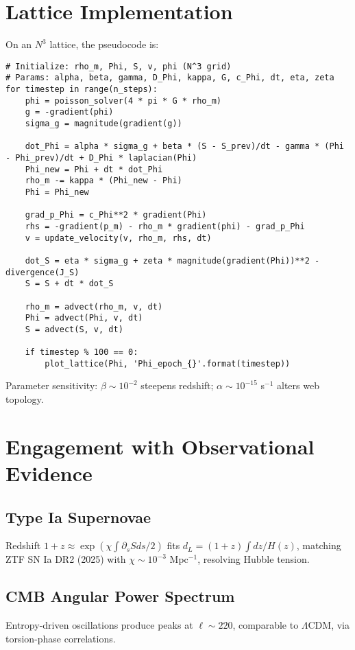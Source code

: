 \documentclass[11pt]{article}
\theoremstyle{plain}
\theoremstyle{definition}
\begin{document}
\section{Lattice Implementation}
\label{sec:simulation_results}
On an $N^3$ lattice, the pseudocode is:
\begin{small}
\begin{verbatim}
# Initialize: rho_m, Phi, S, v, phi (N^3 grid)
# Params: alpha, beta, gamma, D_Phi, kappa, G, c_Phi, dt, eta, zeta
for timestep in range(n_steps):
    phi = poisson_solver(4 * pi * G * rho_m)
    g = -gradient(phi)
    sigma_g = magnitude(gradient(g))
    
    dot_Phi = alpha * sigma_g + beta * (S - S_prev)/dt - gamma * (Phi - Phi_prev)/dt + D_Phi * laplacian(Phi)
    Phi_new = Phi + dt * dot_Phi
    rho_m -= kappa * (Phi_new - Phi)
    Phi = Phi_new
    
    grad_p_Phi = c_Phi**2 * gradient(Phi)
    rhs = -gradient(p_m) - rho_m * gradient(phi) - grad_p_Phi
    v = update_velocity(v, rho_m, rhs, dt)
    
    dot_S = eta * sigma_g + zeta * magnitude(gradient(Phi))**2 - divergence(J_S)
    S = S + dt * dot_S
    
    rho_m = advect(rho_m, v, dt)
    Phi = advect(Phi, v, dt)
    S = advect(S, v, dt)
    
    if timestep % 100 == 0:
        plot_lattice(Phi, 'Phi_epoch_{}'.format(timestep))
\end{verbatim}
\end{small}
Parameter sensitivity: $\beta \sim 10^{-2}$ steepens redshift; $\alpha \sim 10^{-15}$ s$^{-1}$ alters web topology.

\section{Engagement with Observational Evidence}
\label{sec:observational}
\subsection{Type Ia Supernovae}
Redshift $1+z \approx \exp(\chi \int \partial_s S ds / 2)$ fits $d_L = (1+z) \int dz / H(z)$, matching ZTF SN Ia DR2 (2025) with $\chi \sim 10^{-3}$ Mpc$^{-1}$, resolving Hubble tension.

\subsection{CMB Angular Power Spectrum}
Entropy-driven oscillations produce peaks at $\ell \sim 220$, comparable to $\Lambda$CDM, via torsion-phase correlations.
\end{document}
